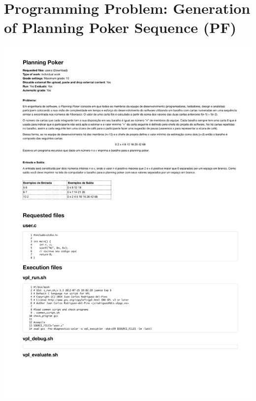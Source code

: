 \section{Programming Problem: Generation of Planning Poker Sequence (PF)}
\label{annex:third-study-pF}
\includegraphics[page=1,width=1\textwidth]{images/annex/third-study-pF.pdf}


\newpage
